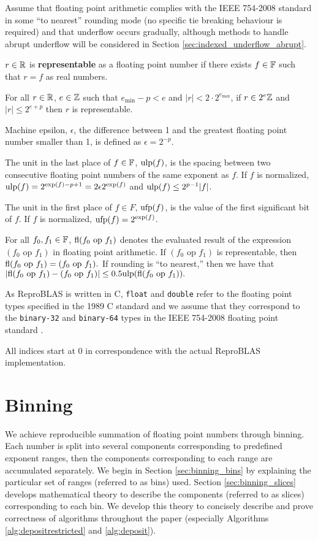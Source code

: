   Assume that floating point arithmetic complies with the IEEE 754-2008
  standard \cite{ieee754} in some ``to nearest'' rounding mode (no specific tie
  breaking behaviour is required) and that underflow occurs gradually, although
  methods to handle abrupt underflow will be considered in Section
  \ref{sec:indexed_underflow_abrupt}.

  $r \in \mathbb{R}$ is \textbf{representable} as a floating point number if there
  exists $f \in \mathbb{F}$ such that $r = f$ as real numbers.

  For all $r \in \mathbb{R}$, $e \in \mathbb{Z}$ such that $e_{\min} - p < e$ and $|r| < 2
  \cdot 2^{e_{\max}}$, if $r \in 2^e\mathbb{Z}$ and $|r| \leq 2^{e + p}$ then $r$ is
  representable.

  Machine epsilon, $\epsilon$, the difference between 1 and the greatest
  floating point number smaller than 1, is defined as $\epsilon = 2^{-p}$.

  The unit in the last place of $f \in \mathbb{F}$, $\text{ulp}(f)$, is the spacing between
  two consecutive floating point numbers of the same exponent as $f$. If $f$ is
  normalized, $\text{ulp}(f) = 2^{\text{exp}(f) - p + 1} = 2  \epsilon  2^{\text{exp}(f)}$ and
  $\text{ulp}(f) \leq 2^{p - 1}|f|$.

  The unit in the first place of $f \in F$, $\text{ufp}(f)$, is the value of the
  first significant bit of $f$. If $f$ is normalized, $\text{ufp}(f) = 2^{\text{exp}(f)}$.

  For all $f_0, f_1 \in \mathbb{F}$, $\text{fl}(f_0 \text{ op } f_1)$ denotes the evaluated
  result of the expression $(f_0 \text{ op } f_1)$ in floating point
  arithmetic. If $(f_0 \text{ op } f_1)$ is representable, then
  \(
    \text{fl}(f_0 \text{ op } f_1) = (f_0 \text{ op } f_1).
  \)
  If rounding is ``to nearest,'' then we have that
  \(
    |\text{fl}(f_0 \text{ op } f_1) - (f_0 \text{ op } f_1)| \leq 0.5\text{ulp}(\text{fl}(f_0 \text{ op } f_1)).
  \)

  As ReproBLAS is written in C, \texttt{float} and \texttt{double} refer to the
  floating point types specified in the 1989 C standard \cite{c89} and we
  assume that they correspond to the \texttt{binary-32} and \texttt{binary-64}
  types in the IEEE 754-2008 floating point standard \cite{ieee754}.

  All indices start at $0$ in correspondence with the actual ReproBLAS implementation.

\section{Binning}
\label{sec:binning}
We achieve reproducible summation of floating point numbers through binning.
Each number is split into several components corresponding to predefined
exponent ranges, then the components corresponding to each range are
accumulated separately. We begin in Section \ref{sec:binning_bins} by
explaining the particular set of ranges (referred to as bins) used. Section
\ref{sec:binning_slices} develops mathematical theory to describe the
components (referred to as slices) corresponding to each bin. We develop this
theory to concisely describe and prove correctness of algorithms throughout the
paper (especially Algorithms \ref{alg:depositrestricted} and
\ref{alg:deposit}).


